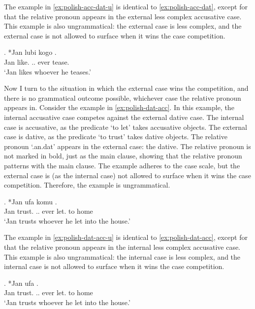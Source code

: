 The example in \ref{ex:polish-acc-dat-u} is identical to \ref{ex:polish-acc-dat}, except for that the relative pronoun appears in the external less complex accusative case. This example is also ungrammatical: the external case is less complex, and the external case is not allowed to surface when it wins the case competition.

\exg. *Jan lubi kogo  .\\
Jan like.\scsub{[acc]} .. ever tease.\scsub{[dat]}\\
`Jan likes whoever he teases.' \label{ex:polish-acc-dat-u}

Now I turn to the situation in which the external case wins the competition, and there is no grammatical outcome possible, whichever case the relative pronoun appears in.
Consider the example in \ref{ex:polish-dat-acc}. In this example, the internal accusative case competes against the external dative case.
The internal case is accusative, as the predicate  `to let' takes accusative objects.
The external case is dative, as the predicate  `to trust' takes dative objects.
The relative pronoun  `.\ac{an}.\ac{dat}' appears in the external case: the dative. The relative pronoun is not marked in bold, just as the main clause, showing that the relative pronoun patterns with the main clause.
The example adheres to the case scale, but the external case is (as the internal case) not allowed to surface when it wins the case competition. Therefore, the example is ungrammatical.

\exg. *Jan ufa komu    .\\
Jan trust.\scsub{[dat]} .. ever let.\scsub{[acc]} to home\\
`Jan trusts whoever he let into the house.' \label{ex:polish-dat-acc}

The example in \ref{ex:polish-dat-acc-u} is identical to \ref{ex:polish-dat-acc}, except for that the relative pronoun appears in the internal less complex accusative case. This example is also ungrammatical: the internal case is less complex, and the internal case is not allowed to surface when it wins the case competition.

\exg. *Jan ufa     .\\
Jan trust.\scsub{[dat]} .. ever let.\scsub{[acc]} to home\\
`Jan trusts whoever he let into the house.' \label{ex:polish-dat-acc-u}


